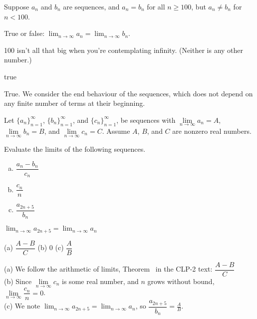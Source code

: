 \begin{Mquestion}
Suppose $a_n$ and $b_n$ are sequences, and $a_n=b_n$ for all $n \geq 100$, but $a_n \neq b_n$ for $n < 100$.

True or false: $\displaystyle\lim_{n \to \infty} a_n = \lim_{n \to \infty} b_n$.
\end{Mquestion}
\begin{hint}
100 isn't all that big when you're contemplating infinity. (Neither is any other number.)
\end{hint}
\begin{answer}
true
\end{answer}
\begin{solution}
True. We consider the end behaviour of the sequences, which does not depend on any finite number of terms at their beginning.
\end{solution}
\begin{question}
Let $\{a_n\}_{n=1}^{\infty}$, $\{b_n\}_{n=1}^{\infty}$,  and $\{c_n\}_{n=1}^{\infty}$,  be sequences with
$\lim\limits_{n \to \infty}a_n=A$, $\lim\limits_{n \to \infty}b_n=B$, and $\lim\limits_{n \to \infty}c_n=C$. Assume $A$, $B$, and $C$ are nonzero real numbers.

Evaluate the limits of the following sequences.
\begin{enumerate}[(a)]
\item $\dfrac{a_n-b_n}{c_n}$
\item $\dfrac{c_n}{n}$
\item $\dfrac{a_{2n+5}}{b_n}$
\end{enumerate}
\end{question}
\begin{hint}
$\displaystyle\lim_{n \to \infty}a_{2n+5}=\lim_{n \to \infty}a_{n}$
\end{hint}
\begin{answer}
(a) $\dfrac{A-B}{C}$ \qquad (b) 0 \qquad (c) $\dfrac{A}{B}$
\end{answer}
\begin{solution}
(a) We follow the arithmetic of limits, Theorem~ in the CLP-2 text:
$\dfrac{A-B}{C}$\\
(b) Since $\lim\limits_{n \to \infty}{c_n}$ is some real number, and $n$ grows without bound, $\lim\limits_{n \to \infty}\dfrac{c_n}{n}=0$.\\
(c) We note $\displaystyle\lim_{n \to \infty}a_{2n+5}=\lim_{n \to \infty}a_{n}$, so
$\displaystyle\dfrac{a_{2n+5}}{b_n} = \frac{A}{B}$.
\end{solution}

